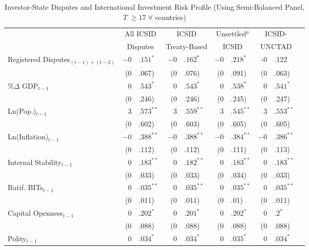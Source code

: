 \documentclass[12pt,onesided]{amsart}
\begin{document}
\begin{table}[ht]
\centering
\caption{Investor-State Disputes and International Investment Risk Profile (Using Semi-Balanced Panel, $T \; \geq 17 \;  \forall$ countries)}
\label{tab:dispRepLevelBal}
\begin{tabular}{lr@{} lr@{}lr@{}lr@{}lr@{}}
  \hline\hline
  & \multicolumn{2}{c}{All ICSID} & \multicolumn{2}{c}{ICSID} & \multicolumn{2}{c}{Unsettled$^{a}$} & \multicolumn{2}{c}{ICSID-} \\ 
  & \multicolumn{2}{c}{Disputes} & \multicolumn{2}{c}{Treaty-Based} & \multicolumn{2}{c}{ICSID} & \multicolumn{2}{c}{UNCTAD} \\
 \hline
Registered Disputes$_{(t-1) + (t-2)}$ & $-0$&$.151^{\ast}$ & $-0$&$.162^{\ast}$ & $-0$&$.218^{\ast}$ & -0&.122 \\ 
   & (0&.067) & (0&.076) & (0&.091) & (0&.063) \\ 
  \%$\Delta$ GDP$_{t-1}$ & $0$&$.543^{\ast}$ & $0$&$.543^{\ast}$ & $0$&$.538^{\ast}$ & $0$&$.541^{\ast}$ \\ 
   & (0&.246) & (0&.246) & (0&.245) & (0&.247) \\ 
  Ln(Pop.)$_{t-1}$ & $3$&$.573^{\ast\ast}$ & $3$&$.559^{\ast\ast}$ & $3$&$.545^{\ast\ast}$ & $3$&$.553^{\ast\ast}$ \\ 
   & (0&.602) & (0&.603) & (0&.605) & (0&.605) \\ 
  Ln(Inflation)$_{t-1}$ & $-0$&$.388^{\ast\ast}$ & $-0$&$.388^{\ast\ast}$ & $-0$&$.384^{\ast\ast}$ & $-0$&$.386^{\ast\ast}$ \\ 
   & (0&.112) & (0&.112) & (0&.111) & (0&.113) \\ 
  Internal Stability$_{t-1}$ & $0$&$.183^{\ast\ast}$ & $0$&$.182^{\ast\ast}$ & $0$&$.183^{\ast\ast}$ & $0$&$.183^{\ast\ast}$ \\ 
   & (0&.033) & (0&.033) & (0&.034) & (0&.033) \\ 
  Ratif. BITs$_{t-1}$ & $0$&$.035^{\ast\ast}$ & $0$&$.035^{\ast\ast}$ & $0$&$.035^{\ast\ast}$ & $0$&$.035^{\ast\ast}$ \\ 
   & (0&.011) & (0&.011) & (0&.01) & (0&.011) \\ 
  Capital Openness$_{t-1}$ & $0$&$.202^{\ast}$ & $0$&$.201^{\ast}$ & $0$&$.202^{\ast}$ & $0$&$.2^{\ast}$ \\ 
   & (0&.088) & (0&.088) & (0&.088) & (0&.088) \\ 
  Polity$_{t-1}$ & $0$&$.034^{\ast}$ & $0$&$.034^{\ast}$ & $0$&$.035^{\ast}$ & $0$&$.034^{\ast}$ \\ 

\end{tabular}
\end{table}
\end{document}
